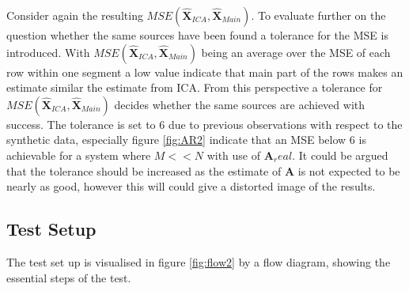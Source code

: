 Consider again the resulting $MSE(\hat{\textbf{X}}_{ICA},\hat{\textbf{X}}_{Main})$. To evaluate further on the question whether the same sources have been found a tolerance for the MSE is introduced. With $MSE(\hat{\textbf{X}}_{ICA},\hat{\textbf{X}}_{Main})$ being an average over the MSE of each row within one segment a low value indicate that main part of the rows makes an estimate similar the estimate from ICA. From this perspective a tolerance for $MSE(\hat{\textbf{X}}_{ICA},\hat{\textbf{X}}_{Main})$ decides whether the same sources are achieved with success. The tolerance is set to 6 due to previous observations with respect to the synthetic data, especially figure \ref{fig:AR2} indicate that an MSE below 6 is achievable for a system where $M<<N$ with use of $\textbf{A}_real$. It could be argued that the tolerance should be increased as the estimate of $\textbf{A}$ is not expected to be nearly as good, however this will could give a distorted image of the results.          

\subsection{Test Setup}
The test set up is visualised in figure \ref{fig:flow2} by a flow diagram, showing the essential steps of the test. 


